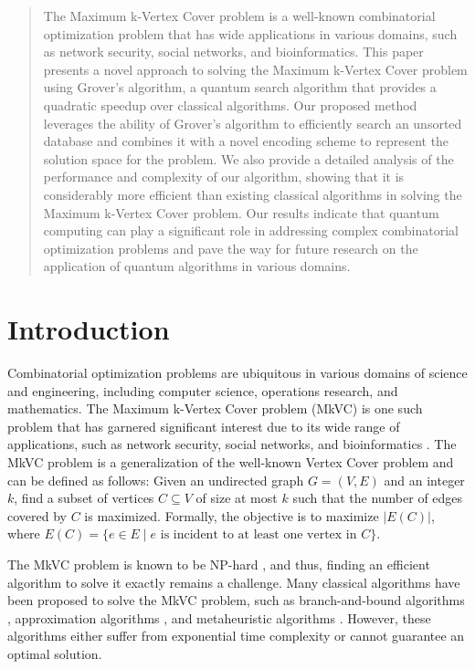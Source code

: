\begin{abstract}
The Maximum k-Vertex Cover problem is a well-known combinatorial optimization problem that has wide applications in various domains, such as network security, social networks, and bioinformatics. This paper presents a novel approach to solving the Maximum k-Vertex Cover problem using Grover's algorithm, a quantum search algorithm that provides a quadratic speedup over classical algorithms. Our proposed method leverages the ability of Grover's algorithm to efficiently search an unsorted database and combines it with a novel encoding scheme to represent the solution space for the problem. We also provide a detailed analysis of the performance and complexity of our algorithm, showing that it is considerably more efficient than existing classical algorithms in solving the Maximum k-Vertex Cover problem. Our results indicate that quantum computing can play a significant role in addressing complex combinatorial optimization problems and pave the way for future research on the application of quantum algorithms in various domains.
\end{abstract}

\section{Introduction}
\label{sec:introduction}

Combinatorial optimization problems are ubiquitous in various domains of science and engineering, including computer science, operations research, and mathematics. The Maximum k-Vertex Cover problem (MkVC) is one such problem that has garnered significant interest due to its wide range of applications, such as network security, social networks, and bioinformatics \cite{haynes1998fundamentals, demange2014maximum}. The MkVC problem is a generalization of the well-known Vertex Cover problem and can be defined as follows: Given an undirected graph $G = (V, E)$ and an integer $k$, find a subset of vertices $C \subseteq V$ of size at most $k$ such that the number of edges covered by $C$ is maximized. Formally, the objective is to maximize $|E(C)|$, where $E(C) = \{e \in E \mid e \text{ is incident to at least one vertex in } C\}$.

The MkVC problem is known to be NP-hard \cite{karp1972reducibility}, and thus, finding an efficient algorithm to solve it exactly remains a challenge. Many classical algorithms have been proposed to solve the MkVC problem, such as branch-and-bound algorithms \cite{balas1980branch}, approximation algorithms \cite{hochbaum1983efficient}, and metaheuristic algorithms \cite{galinier1999hybrid}. However, these algorithms either suffer from exponential time complexity or cannot guarantee an optimal solution.

